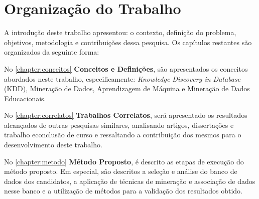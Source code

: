 


\section{Organização do Trabalho}
A introdução deste trabalho apresentou: o contexto, definição do problema, objetivos, metodologia e contribuições dessa pesquisa. Os capítulos restantes são organizados da seguinte forma:

\par
No \autoref{chapter:conceitos} \textbf{Conceitos e Definições}, são apresentados os conceitos abordados neste trabalho, especificamente: \textit{Knowledge Discovery in Database} (KDD), Mineração de Dados, Aprendizagem de Máquina e Mineração de Dados Educacionais.

\par
No \autoref{chapter:correlatos} \textbf{Trabalhos Correlatos}, será apresentado os resultados alcançados de outras pesquisas similares, analisando artigos, dissertações e trabalho econclusão de curso e ressaltando a contribuição dos mesmos para o desenvolvimento deste trabalho.

\par
No \autoref{chapter:metodo} \textbf{Método Proposto}, é descrito as etapas de execução do método proposto. Em especial, são descritos a seleção e análise do banco de dados dos candidatos, a aplicação de técnicas de mineração e associação de dados nesse banco e a utilização de métodos para a validação dos resultados obtido.

